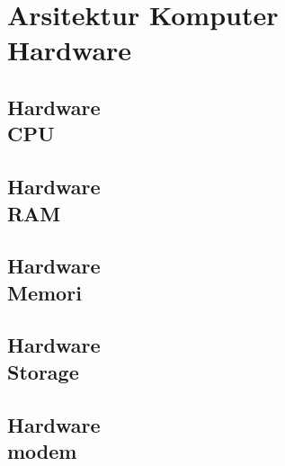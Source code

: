 \documentclass{WileySix}
\begin{document}
\part[Hardware dan Networking]
{Arsitektur Komputer\\ Hardware}

%

\chapter[CPU atau Prosesor]
{Hardware\\ CPU}


\chapter[RAM]
{Hardware\\ RAM}


%

\chapter[Memori]
{Hardware\\ Memori}


\chapter[Storage]
{Hardware\\ Storage}



\chapter[Modem]
{Hardware\\ modem}


%
\end{document}
